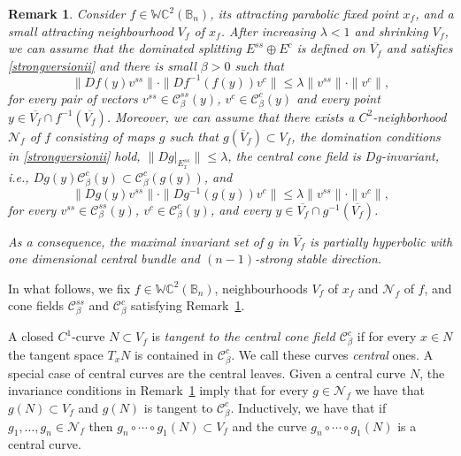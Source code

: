 \documentclass[11pt,reqno]{amsart}
\theoremstyle{plain}
\newtheorem{remark}[theorem]{Remark}
\newtheorem*{theorem A}{Theorem A}
\newtheorem*{theorem B}{Theorem B}
\newtheorem*{theorem C}{Theorem C}
\newtheorem*{theorem 1}{Theorem 1}
\newtheorem*{theorem 2}{Theorem 2}
\newtheorem*{theorem 3}{Theorem 3}
\numberwithin{equation}{section}
\begin{document}
\begin{remark}\label{pert}
Consider $f\in\mathbb{WC}^2 ( \mathbb{B}_n)$, its attracting parabolic fixed point $x_f$, and a small attracting neighbourhood $V_f$ of $x_f$.
After increasing $\lambda <1$ and shrinking $V_f$, we can assume that the dominated splitting $E^{ss} \oplus E^{c}$ is defined on $\overline{V_f}$ and satisfies \eqref{strongversionii} and there is small $\beta>0$ such that
\begin{equation}\label{e3}
\|Df(y)v^{ss}\| \cdot \|Df^{-1}(f(y))v^{c}\| \leq \lambda \|v^{ss}\| \cdot \|v^{c}\|,
\end{equation}
for every pair of vectors $v^{ss}\in \mathcal{C}^{ss}_\beta(y)$, $v^c \in \mathcal{C}^c_\beta(y)$ and every point $y \in \overline{V_f} \cap f^{-1}(\overline{V_f})$.
Moreover, we can assume that there exists a $C^2$-neighborhood $\mathcal{N}_f$ of $f$ consisting of maps $g$ such that $g(\overline V_f) \subset V_f$, the domination conditions in \eqref{strongversionii} hold, $\|D g|_{E^{ss}_x}\| \leq \lambda$, the central cone field is $Dg$-invariant, i.e., $Dg(y)\mathcal{C}^c_\beta(y)\subset \mathcal{C}^c_\beta(g(y))$, and
\begin{equation}\label{e4}
\|Dg(y)v^{ss}\| \cdot \|Dg^{-1}(g(y))v^{c}\| \leq \lambda \|v^{ss}\| \cdot \|v^{c}\|,
\end{equation}
for every $v^{ss} \in \mathcal{C}_\beta ^{ss}(y)$, $v^{c} \in \mathcal{C}_\beta ^{c}(y)$, and every $y \in \overline{V_f} \cap g^{-1}(\overline{V_f})$.

As a consequence, the maximal invariant set of $g$ in $\overline{V_f}$ is partially hyperbolic with one dimensional central bundle and $(n-1)$-strong stable direction.
\end{remark}

In what follows, we fix $f\in\mathbb{WC}^2 ( \mathbb{B}_n)$, neighbourhoods $V_f$ of $x_f$ and $\mathcal{N}_f$ of $f$, and cone fields $\mathcal{C}_\beta ^{ss}$ and $\mathcal{C}_\beta ^{c}$ satisfying Remark~\ref{pert}.

A closed $C^1$-curve $N\subset V_f$ is \emph{tangent to the central cone field $\mathcal{C}_\beta ^{c}$} if for every $x\in N$ the tangent space $T_xN$ is contained in $\mathcal{C}_\beta ^{c}$.
We call these curves \emph{central} ones.
A special case of central curves are the central leaves.
Given a central curve $N$, the invariance conditions in Remark~\ref{pert} imply that for every $g \in \mathcal{N}_f$ we have that $g(N) \subset V_f$ and $g(N)$ is tangent to $\mathcal{C}_\beta ^{c}$.
Inductively, we have that if $g_1, \dots, g_n \in \mathcal{N}_f$ then $g_n \circ \cdots \circ g_1 (N) \subset V_f$ and the curve $g_n \circ \cdots \circ g_1 (N) $ is a central curve.
\end{document}
